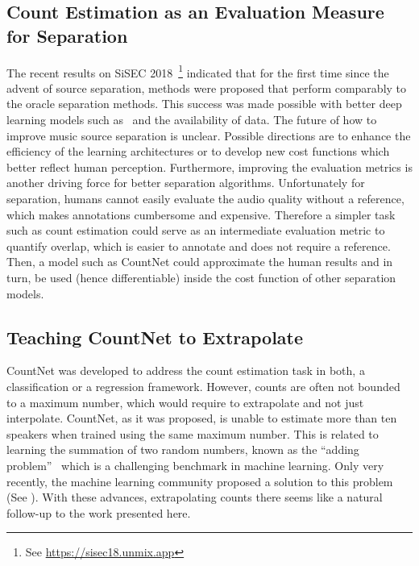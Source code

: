 \subsection*{Count Estimation as an Evaluation Measure for Separation}

The recent results on \acs{SiSEC} 2018~\cite{stoeter18sisec}\footnote{See \url{https://sisec18.unmix.app}} indicated that for the first time since the advent of source separation, methods were proposed that perform comparably to the oracle separation methods.
This success was made possible with better deep learning models such as~\cite{takahashi17} and the availability of data.
The future of how to improve music source separation is unclear. Possible directions are to enhance the efficiency of the learning architectures or to develop new cost functions which better reflect human perception.
Furthermore, improving the evaluation metrics is another driving force for better separation algorithms. Unfortunately for separation, humans cannot easily evaluate the audio quality without a reference, which makes annotations cumbersome and expensive.
Therefore a simpler task such as count estimation could serve as an intermediate evaluation metric to quantify overlap, which is easier to annotate and does not require a reference. Then, a model such as CountNet could approximate the human results and in turn, be used (hence differentiable) inside the cost function of other separation models.

\subsection*{Teaching CountNet to Extrapolate}

CountNet was developed to address the count estimation task in both, a classification or a regression framework.
However, counts are often not bounded to a maximum number, which would require to extrapolate and not just interpolate.
CountNet, as it was proposed, is unable to estimate more than ten speakers when trained using the same maximum number.
This is related to learning the summation of two random numbers, known as the ``adding problem''~\cite{Hochreiter97} which is a challenging benchmark in machine learning.
Only very recently, the machine learning community proposed a solution to this problem (See \cite{trask18}).
With these advances, extrapolating counts there seems like a natural follow-up to the work presented here.

